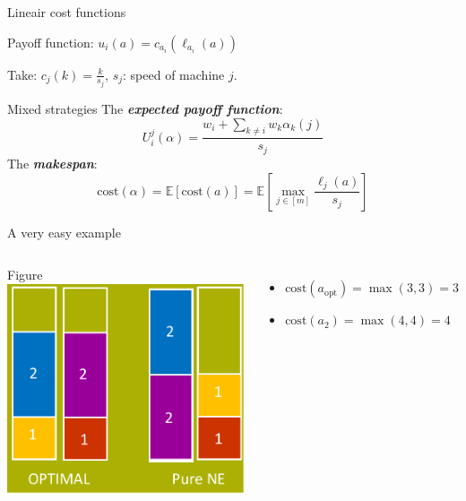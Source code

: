 \documentclass{beamer}
\newcommand{\E}{\mathbb{E}}
\newcommand{\cost}{\text{cost}}
\newcommand{\opt}{\text{opt}}
\newcommand{\copt}{\cost(a_{\opt})}
\begin{document}
\begin{frame}{Lineair cost functions}
\begin{block}{}
\begin{center}
Payoff function: $u_i(a) = c_{a_i}(\ell_{a_i}(a))$
\end{center}
\end{block}
\begin{block}{}
\begin{center}
Take: $c_{j}(k) = \frac{k}{s_j}$, $s_j$: speed of machine $j$.
\end{center}
\end{block}

\begin{block}{Mixed strategies}
The \textbf{\emph{expected payoff function}}:
$$U^j_i(\alpha) = \frac{w_i + \sum_{k\neq i}{w_k\alpha_k(j)}}{s_j} $$
The \emph{\textbf{makespan}}:
$$\cost(\alpha) = \E[\cost(a)] = \E\left[\max_{j\in[m]}\frac{\ell_j(a)}{s_{j}}\right]$$
\end{block}
\end{frame}

\begin{frame}{A very easy example}
\begin{columns}[t]
\column{5.3cm}
\begin{alertblock}{Figure}
\includegraphics[scale=0.5]{figuurpresentatie.pdf}
\end{alertblock}

\column{5.5cm}
\begin{itemize}
\item $\copt = \max(3,3) = 3$
\item $\cost(a_2) = \max(4,4) = 4$
\end{itemize}
\end{columns}
\end{frame}
\end{document}
